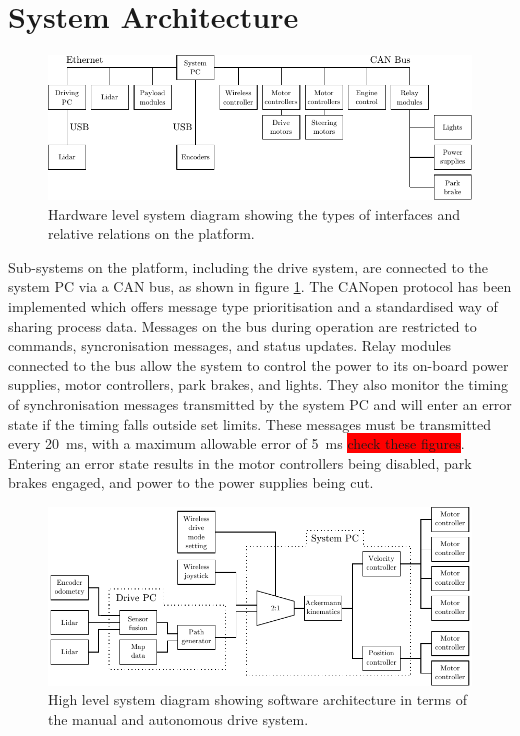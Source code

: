 \documentclass[preprint,authoryear,12pt]{elsarticle}
\begin{document}
\section{System Architecture}
\label{sect:hardware}

    \newcommand{\rpm}{\raisebox{.2ex}{$\scriptstyle\pm$}}

    \begin{figure}[htb]
        \centering
        \includegraphics[width=\linewidth]{imgs/system_diagram/diagram_v3.pdf}
        \caption{Hardware level system diagram showing the types of interfaces and relative relations on the platform.}
        \label{fig:system_diagram}
    \end{figure}
    Sub-systems on the platform, including the drive system, are connected to the system PC via a CAN bus, as shown in figure \ref{fig:system_diagram}.
    The CANopen protocol has been implemented which offers message type prioritisation and a standardised way of sharing process data.
    Messages on the bus during operation are restricted to commands, syncronisation messages, and status updates.
    Relay modules connected to the bus allow the system to control the power to its on-board power supplies, motor controllers, park brakes, and lights.
    They also monitor the timing of synchronisation messages transmitted by the system PC and will enter an error state if the timing falls outside set limits.
    These messages must be transmitted every \SI{20}{\milli\second}, with a maximum allowable error of \rpm \SI{5}{\milli\second} \colorbox{red}{check these figures}.
    Entering an error state results in the motor controllers being disabled, park brakes engaged, and power to the power supplies being cut.

    \begin{figure}[htb]
        \centering
        \includegraphics[width=\linewidth]{imgs/system_diagram/software.pdf}
        \caption{High level system diagram showing software architecture in terms of the manual and autonomous drive system.}
        \label{fig:system_diagram_software}
    \end{figure}
\end{document}
